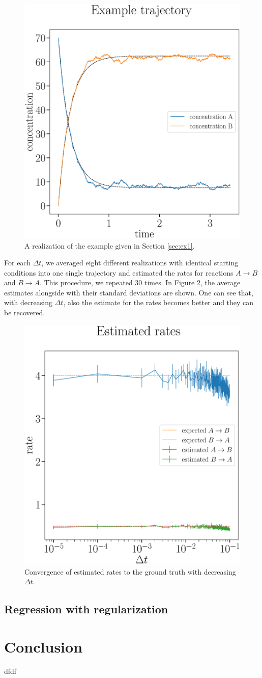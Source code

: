 \documentclass[oneside, abstracton, titlepage]{scrartcl}
\begin{document}
	\begin{figure}
		\begin{center}
			\includegraphics[width=.5\textwidth]{./figures_tex/aux_ex1_concentration_curves}
		\end{center}
		\caption{A realization of the example given in Section \ref{sec:ex1}.}
		\label{ex1:concentration-curves}
	\end{figure}
	
	For each $\Delta t$, we averaged eight different realizations with identical starting conditions into one single trajectory and estimated the rates for reactions $A\to B$ and $B\to A$. This procedure, we repeated $30$ times. In Figure \ref{ex1:rates-convergence}, the average estimates alongside with their standard deviations are shown. One can see that, with decreasing $\Delta t$, also the estimate for the rates becomes better and they can be recovered.
	
	\begin{figure}
		\begin{center}
			\includegraphics[width=.5\textwidth]{./figures_tex/aux_rates_convergence}
		\end{center}
		\caption{Convergence of estimated rates to the ground truth with decreasing $\Delta t$.}
		\label{ex1:rates-convergence}
	\end{figure}
	
	\subsection{Regression with regularization}
	
	
	
	\section{Conclusion}
	dfdf
	
	
	\newpage
% 	
	
	
	
\end{document}
